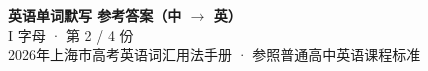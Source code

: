 \documentclass[10pt,a4paper]{article}
\begin{document}
\pagestyle{plain}

\begin{center}
{\LARGE\bfseries 英语单词默写 \quad 参考答案（中 $\to$ 英）}\\[0.22em]
{\large I 字母 · 第 2 / 4 份}\\[0.18em]
{\small 2026年上海市高考英语词汇用法手册 · 参照普通高中英语课程标准}
\end{center}

\vspace{0.2em}
\noindent{\color{rulegray}\rule{\textwidth}{0.8pt}}

\vspace{0.35em}

\vspace{0.25em}
\renewcommand{\arraystretch}{1.32}
\end{document}
